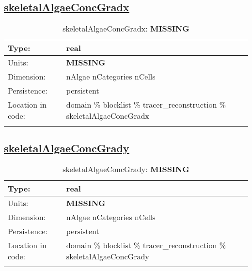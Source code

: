\subsection[skeletalAlgaeConcGradx]{\hyperref[sec:var_tab_tracer_reconstruction]{skeletalAlgaeConcGradx}}
\label{subsec:var_sec_tracer_reconstruction_skeletalAlgaeConcGradx}
\begin{center}
\begin{longtable}{| p{2.0in} | p{4.0in} |}
        \hline 
        Type: & real \\
        \hline 
        Units: & {\bf \color{red} MISSING} \\
        \hline 
        Dimension: & nAlgae nCategories nCells \\
        \hline 
        Persistence: & persistent \\
        \hline 
         Location in code: & domain \% blocklist \% tracer\_reconstruction \% skeletalAlgaeConcGradx \\
         \hline 
    \caption{skeletalAlgaeConcGradx: {\bf \color{red} MISSING}}
\end{longtable}
\end{center}
\subsection[skeletalAlgaeConcGrady]{\hyperref[sec:var_tab_tracer_reconstruction]{skeletalAlgaeConcGrady}}
\label{subsec:var_sec_tracer_reconstruction_skeletalAlgaeConcGrady}
\begin{center}
\begin{longtable}{| p{2.0in} | p{4.0in} |}
        \hline 
        Type: & real \\
        \hline 
        Units: & {\bf \color{red} MISSING} \\
        \hline 
        Dimension: & nAlgae nCategories nCells \\
        \hline 
        Persistence: & persistent \\
        \hline 
         Location in code: & domain \% blocklist \% tracer\_reconstruction \% skeletalAlgaeConcGrady \\
         \hline 
    \caption{skeletalAlgaeConcGrady: {\bf \color{red} MISSING}}
\end{longtable}
\end{center}
